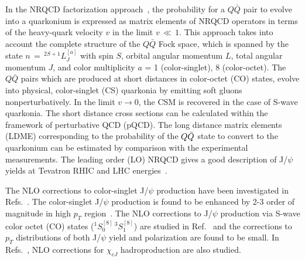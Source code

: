 \documentclass[aps,prc,preprint,superscriptaddress,showpacs,showkeys,amsmath]{revtex4-1}
\begin{document}
  In the NRQCD factorization approach~\cite{Bodwin:1994jh},
the probability for a $Q\bar Q$ pair to evolve into a quarkonium is expressed
as matrix elements of NRQCD operators in terms of the heavy-quark velocity 
$v$ in the limit $v\,\ll\,1$. This approach takes into account the complete structure of 
the $Q\bar Q$ Fock space, which is spanned by the state $n\,=\,^{2S+1}L_{J}^{[a]}$ 
with spin $S$, orbital angular momentum $L$, total angular momentum $J$, 
and color multiplicity $a$ = 1 (color-singlet), 8 (color-octet). 
 The $Q\bar Q$ pairs which are produced at short distances in color-octet (CO) states, 
evolve into physical, color-singlet (CS) quarkonia by emitting soft gluons 
nonperturbatively.
 In the limit $v\rightarrow0$, the CSM is recovered in the case of S-wave quarkonia.
 The short distance cross sections can be calculated within the 
framework of perturbative QCD (pQCD). The long distance matrix elements (LDME) 
corresponding to the probability of the $Q{\bar{Q}}$ state to convert to the quarkonium 
can be estimated by comparison with the experimental measurements. 
  The leading order (LO) NRQCD gives a good description of J/$\psi$ yields at 
Tevatron RHIC and LHC energies~\cite{Beneke:1996yw,Braaten:1999qk,Sharma:2012dy}.

  The NLO corrections to color-singlet J/$\psi$ production have been investigated 
in Refs.~\cite{Campbell:2007ws,Gong:2008sn}. The color-singlet J/$\psi$ 
production is found to be enhanced by 2-3 order of magnitude in high 
$p_T$ region~\cite{Gong:2008sn}.
 The NLO corrections to J/$\psi$ production via S-wave 
color octet (CO) states ($^1S_{0}^{[8]}\,^3S_{1}^{[8]}$) are studied in 
Ref.~\cite{Gong:2008ft} and the corrections to $p_{T}$ distributions of both 
J/$\psi$ yield and polarization are found to be small. In Refs.~\cite{Ma:2010vd}, 
NLO corrections for $\chi_{cJ}$ hadroproduction are also studied. 
\end{document}
